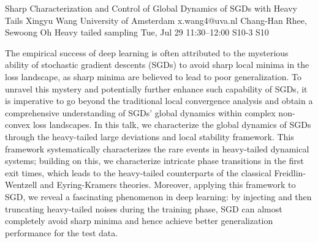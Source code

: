 \documentclass[12pt,lettersize,oneside]{book} %
\begin{document}
\begin{talk}
  {Sharp Characterization and Control of Global Dynamics of SGDs with Heavy Tails}%
  {Xingyu Wang}%
  {University of Amsterdam}%
  {x.wang4@uva.nl}%
  {Chang-Han Rhee, Sewoong Oh}%
  {Heavy tailed sampling}%
  {Tue, Jul 29 11:30--12:00}%
  {S10-3}%
  {S10}%
    
   
The empirical success of deep learning is often attributed to the mysterious ability of stochastic gradient descents (SGDs) to avoid sharp local minima in the loss landscape, as sharp minima are believed to lead to poor generalization. To unravel this mystery and potentially further enhance such capability of SGDs, it is imperative to go beyond the traditional local convergence analysis and obtain a comprehensive understanding of SGDs' global dynamics within complex non-convex loss landscapes. In this talk, we characterize the global dynamics of SGDs through the heavy-tailed large deviations and local stability framework. This framework systematically characterizes the rare events in heavy-tailed dynamical systems; building on this, we characterize intricate phase transitions in the first exit times, which leads to the heavy-tailed counterparts of the classical Freidlin-Wentzell and Eyring-Kramers theories. Moreover, applying this framework to SGD, we reveal a fascinating phenomenon in deep learning: by injecting and then truncating heavy-tailed noises during the training phase, SGD can almost completely avoid sharp minima and hence achieve better generalization performance for the test data.



\end{talk}
\end{document}
